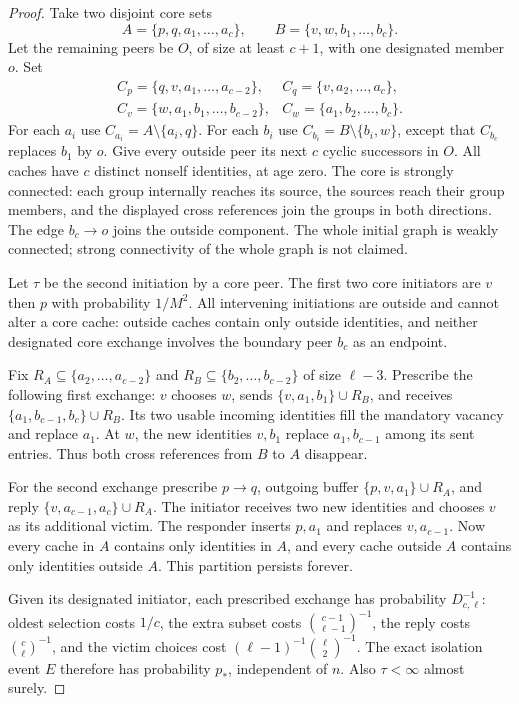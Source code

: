 \documentclass[11pt]{article}
\begin{document}
\begin{proof}
Take two disjoint core sets
\[
 A=\{p,q,a_1,\ldots,a_c\},\qquad
 B=\{v,w,b_1,\ldots,b_c\}.
\]
Let the remaining peers be $O$, of size at least $c+1$, with
one designated member $o$. Set
\[
\begin{array}{ll}
 C_p=\{q,v,a_1,\ldots,a_{c-2}\},&
 C_q=\{v,a_2,\ldots,a_c\},\\
 C_v=\{w,a_1,b_1,\ldots,b_{c-2}\},&
 C_w=\{a_1,b_2,\ldots,b_c\}.
\end{array}
\]
For each $a_i$ use $C_{a_i}=A\setminus\{a_i,q\}$.
For each $b_i$ use $C_{b_i}=B\setminus\{b_i,w\}$, except
that $C_{b_c}$ replaces $b_1$ by $o$.
Give every outside peer its next $c$ cyclic successors in $O$.
All caches have $c$ distinct nonself identities, at age zero.
The core is strongly connected: each group internally reaches
its source, the sources reach their group members, and the
displayed cross references join the groups in both directions.
The edge $b_c\to o$ joins the outside component.
The whole initial graph is weakly connected; strong connectivity
of the whole graph is not claimed.

Let $\tau$ be the second initiation by a core peer.
The first two core initiators are $v$ then $p$ with probability
$1/M^2$. All intervening initiations are outside and cannot
alter a core cache: outside caches contain only outside
identities, and neither designated core exchange involves
the boundary peer $b_c$ as an endpoint.

Fix $R_A\subseteq\{a_2,\ldots,a_{c-2}\}$ and
$R_B\subseteq\{b_2,\ldots,b_{c-2}\}$ of size $\ell-3$.
Prescribe the following first exchange:
$v$ chooses $w$, sends
$\{v,a_1,b_1\}\cup R_B$, and receives
$\{a_1,b_{c-1},b_c\}\cup R_B$.
Its two usable incoming identities fill the mandatory vacancy
and replace $a_1$. At $w$, the new identities $v,b_1$ replace
$a_1,b_{c-1}$ among its sent entries.
Thus both cross references from $B$ to $A$ disappear.

For the second exchange prescribe $p\to q$, outgoing buffer
$\{p,v,a_1\}\cup R_A$, and reply
$\{v,a_{c-1},a_c\}\cup R_A$.
The initiator receives two new identities and chooses $v$
as its additional victim. The responder inserts $p,a_1$
and replaces $v,a_{c-1}$.
Now every cache in $A$ contains only identities in $A$, and
every cache outside $A$ contains only identities outside $A$.
This partition persists forever.

Given its designated initiator, each prescribed exchange has
probability $D_{c,\ell}^{-1}$: oldest selection costs $1/c$,
the extra subset costs $\binom{c-1}{\ell-1}^{-1}$,
the reply costs $\binom c\ell^{-1}$, and the victim choices
cost $(\ell-1)^{-1}\binom\ell2^{-1}$.
The exact isolation event $E$ therefore has probability $p_*$,
independent of $n$. Also $\tau<\infty$ almost surely.


\end{proof}
\end{document}
